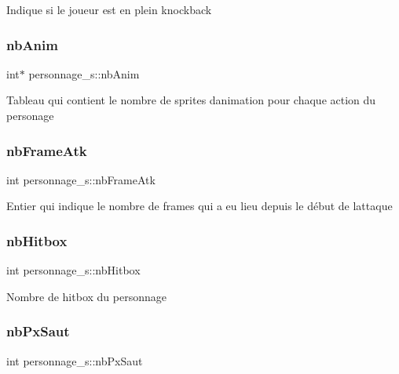 Indique si le joueur est en plein knockback \mbox{\label{structpersonnage__s_a05aa3037a7469f58464094d2bd2d683a}} 
\subsubsection{\texorpdfstring{nb\+Anim}{nbAnim}}
{\footnotesize\ttfamily int$\ast$ personnage\+\_\+s\+::nb\+Anim}

Tableau qui contient le nombre de sprites d\textquotesingle{}animation pour chaque action du personage \mbox{\label{structpersonnage__s_a9dc9cf38290d069f2bfbdfe1b19184ac}} 
\subsubsection{\texorpdfstring{nb\+Frame\+Atk}{nbFrameAtk}}
{\footnotesize\ttfamily int personnage\+\_\+s\+::nb\+Frame\+Atk}

Entier qui indique le nombre de frames qui a eu lieu depuis le début de l\textquotesingle{}attaque \mbox{\label{structpersonnage__s_a4f0dc729152bf8aaeefcb26ab6714aee}} 
\subsubsection{\texorpdfstring{nb\+Hitbox}{nbHitbox}}
{\footnotesize\ttfamily int personnage\+\_\+s\+::nb\+Hitbox}

Nombre de hitbox du personnage \mbox{\label{structpersonnage__s_a47e8c34ccb98b49ca57baa55d4326ee3}} 
\subsubsection{\texorpdfstring{nb\+Px\+Saut}{nbPxSaut}}
{\footnotesize\ttfamily int personnage\+\_\+s\+::nb\+Px\+Saut}

